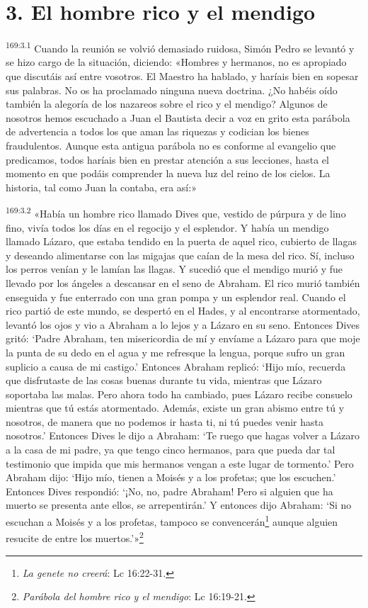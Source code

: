 \section*{3. El hombre rico y el mendigo}
\par 
\textsuperscript{169:3.1} Cuando la reunión se volvió demasiado ruidosa, Simón Pedro se levantó y se hizo cargo de la situación, diciendo: «Hombres y hermanos, no es apropiado que discutáis así entre vosotros. El Maestro ha hablado, y haríais bien en sopesar sus palabras. No os ha proclamado ninguna nueva doctrina. ¿No habéis oído también la alegoría de los nazareos sobre el rico y el mendigo? Algunos de nosotros hemos escuchado a Juan el Bautista decir a voz en grito esta parábola de advertencia a todos los que aman las riquezas y codician los bienes fraudulentos. Aunque esta antigua parábola no es conforme al evangelio que predicamos, todos haríais bien en prestar atención a sus lecciones, hasta el momento en que podáis comprender la nueva luz del reino de los cielos. La historia, tal como Juan la contaba, era así:»

\par 
\textsuperscript{169:3.2} «Había un hombre rico llamado Dives que, vestido de púrpura y de lino fino, vivía todos los días en el regocijo y el esplendor. Y había un mendigo llamado Lázaro, que estaba tendido en la puerta de aquel rico, cubierto de llagas y deseando alimentarse con las migajas que caían de la mesa del rico. Sí, incluso los perros venían y le lamían las llagas. Y sucedió que el mendigo murió y fue llevado por los ángeles a descansar en el seno de Abraham. El rico murió también enseguida y fue enterrado con una gran pompa y un esplendor real. Cuando el rico partió de este mundo, se despertó en el Hades, y al encontrarse atormentado, levantó los ojos y vio a Abraham a lo lejos y a Lázaro en su seno. Entonces Dives gritó: `Padre Abraham, ten misericordia de mí y envíame a Lázaro para que moje la punta de su dedo en el agua y me refresque la lengua, porque sufro un gran suplicio a causa de mi castigo.' Entonces Abraham replicó: `Hijo mío, recuerda que disfrutaste de las cosas buenas durante tu vida, mientras que Lázaro soportaba las malas. Pero ahora todo ha cambiado, pues Lázaro recibe consuelo mientras que tú estás atormentado. Además, existe un gran abismo entre tú y nosotros, de manera que no podemos ir hasta ti, ni tú puedes venir hasta nosotros.' Entonces Dives le dijo a Abraham: `Te ruego que hagas volver a Lázaro a la casa de mi padre, ya que tengo cinco hermanos, para que pueda dar tal testimonio que impida que mis hermanos vengan a este lugar de tormento.' Pero Abraham dijo: `Hijo mío, tienen a Moisés y a los profetas; que los escuchen.' Entonces Dives respondió: `¡No, no, padre Abraham! Pero si alguien que ha muerto se presenta ante ellos, se arrepentirán.' Y entonces dijo Abraham: `Si no escuchan a Moisés y a los profetas, tampoco se convencerán\footnote{\textit{La genete no creerá}: Lc 16:22-31.} aunque alguien resucite de entre los muertos.'»\footnote{\textit{Parábola del hombre rico y el mendigo}: Lc 16:19-21.}


